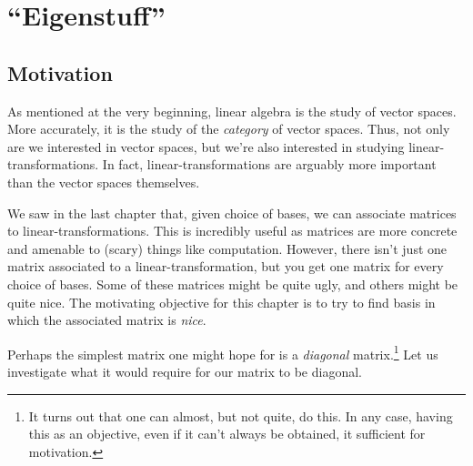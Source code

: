 \chapter{``Eigenstuff''}

\section{Motivation}\label{sct4.1}

As mentioned at the very beginning, linear algebra is the study of vector spaces.  More accurately, it is the study of the \emph{category} of vector spaces.  Thus, not only are we interested in vector spaces, but we're also interested in studying linear-transformations.  In fact, linear-transformations are arguably more important than the vector spaces themselves.

We saw in the last chapter that, given choice of bases, we can associate matrices to linear-transformations.  This is incredibly useful as matrices are more concrete and amenable to (scary) things like computation.  However, there isn't just one matrix associated to a linear-transformation, but you get one matrix for every choice of bases.  Some of these matrices might be quite ugly, and others might be quite nice.  The motivating objective for this chapter is to try to find basis in which the associated matrix is \emph{nice}.

Perhaps the simplest matrix one might hope for is a \emph{diagonal} matrix.\footnote{It turns out that one can almost, but not quite, do this.  In any case, having this as an objective, even if it can't always be obtained, it sufficient for motivation.}  Let us investigate what it would require for our matrix to be diagonal.

